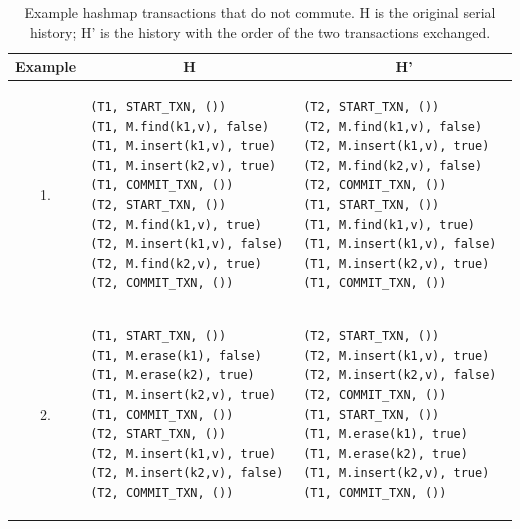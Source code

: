 \begin{table}[t]
    \singlespace
    \centering
    \begin{tabular}{|c|l|l|}
        \hline
        Example & \multicolumn{1}{c}{H} & \multicolumn{1}{|c|}{H'} \\
        \hline
        1.     &
\begin{lstlisting}
(T1, START_TXN, ())                       
(T1, M.find(k1,v), false)
(T1, M.insert(k1,v), true)                       
(T1, M.insert(k2,v), true)                       
(T1, COMMIT_TXN, ())                       
(T2, START_TXN, ())                       
(T2, M.find(k1,v), true)
(T2, M.insert(k1,v), false)
(T2, M.find(k2,v), true)
(T2, COMMIT_TXN, ())                       
\end{lstlisting} &
\begin{lstlisting}
(T2, START_TXN, ())                       
(T2, M.find(k1,v), false)
(T2, M.insert(k1,v), true)
(T2, M.find(k2,v), false)
(T2, COMMIT_TXN, ())                       
(T1, START_TXN, ())                       
(T1, M.find(k1,v), true)
(T1, M.insert(k1,v), false)                       
(T1, M.insert(k2,v), true)                       
(T1, COMMIT_TXN, ())                       
\end{lstlisting}\\
\hline
        2. &
\begin{lstlisting}
(T1, START_TXN, ())                       
(T1, M.erase(k1), false)                       
(T1, M.erase(k2), true)
(T1, M.insert(k2,v), true)                       
(T1, COMMIT_TXN, ())                       
(T2, START_TXN, ())                       
(T2, M.insert(k1,v), true)
(T2, M.insert(k2,v), false)
(T2, COMMIT_TXN, ())                       
\end{lstlisting} &
\begin{lstlisting}
(T2, START_TXN, ())                       
(T2, M.insert(k1,v), true)
(T2, M.insert(k2,v), false)
(T2, COMMIT_TXN, ())                       
(T1, START_TXN, ())                       
(T1, M.erase(k1), true)                       
(T1, M.erase(k2), true)
(T1, M.insert(k2,v), true)                       
(T1, COMMIT_TXN, ())                       
\end{lstlisting}\\
\hline    
    \end{tabular}
    \caption[Example hashmap transactions that do not commute]{Example hashmap transactions that do not commute. H is the original serial history; H' is the history with the order of the two transactions exchanged.}
    \label{tab:txnal_hm_commute}
    \end{table}

